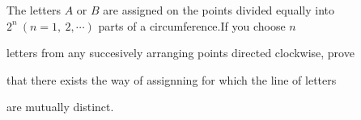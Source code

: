 The letters $A$ or $B$ are assigned on the points divided equally into $2^{n}\ (n=1,\ 2,\cdots)$ parts of a circumference.If you choose $n$

 letters from any succesively arranging points directed clockwise, prove

 that there exists the way of assignning for which the line of letters 

are mutually distinct.